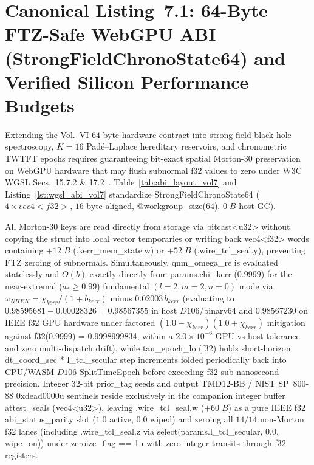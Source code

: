 \documentclass[11pt,a4paper,reqno]{article}
\def\texttt#1{#1}%
\def\mathrm#1{#1}%
\def\mathcal#1{#1}%
\def\mathbb#1{#1}%
\def\Done{D106}%
\theoremstyle{plain}
\theoremstyle{definition}
\theoremstyle{remark}
\numberwithin{equation}{section}
\numberwithin{table}{section}
\newcommand{\Done}{\mathbb{D}_{106}}
\begin{document}
{\raggedright
\section{\texorpdfstring{Canonical Listing~7.1: 64-Byte FTZ-Safe WebGPU ABI (\texttt{StrongFieldChronoState64}) and Verified Silicon Performance Budgets}{Canonical Listing 7.1: 64-Byte FTZ-Safe WebGPU ABI (StrongFieldChronoState64) and Verified Silicon Performance Budgets}}
}
\label{sec:wgsl_abi_vol7}

Extending the Vol.~VI $64$-byte hardware contract \cite{AppliedPuristVol6Solinas2026} into strong-field black-hole spectroscopy, $K=16$ Pad\'e--Laplace hereditary reservoirs, and chronometric TWTFT epochs requires guaranteeing bit-exact spatial Morton-30 preservation on WebGPU hardware that may flush subnormal \texttt{f32} values to zero under W3C WGSL Secs.~15.7.2 \& 17.2~\cite{W3CWGSL2026}. Table~\ref{tab:abi_layout_vol7} and Listing~\ref{lst:wgsl_abi_vol7} standardize \texttt{StrongFieldChronoState64} ($4 \times \texttt{vec4<f32>}$, $16$-byte aligned, \texttt{@workgroup\_size(64)}, $0\;\mathrm{B}$ host GC).

All Morton-30 keys are read directly from storage via \texttt{bitcast<u32>} without copying the struct into local vector temporaries or writing back \texttt{vec4<f32>} words containing $+12\;\mathrm{B}$ (\texttt{.kerr\_mem\_state.w}) or $+52\;\mathrm{B}$ (\texttt{.wire\_tcl\_seal.y}), preventing FTZ zeroing of subnormals. Simultaneously, \texttt{qnm\_omega\_re} is evaluated statelessly and $\mathcal{O}(b)$-exactly directly from \texttt{params.chi\_kerr} ($0.9999$) for the near-extremal ($a_* \ge 0.99$) fundamental $(l=2, m=2, n=0)$ mode via $\omega_{\mathrm{NHEK}} = \chi_{\mathrm{kerr}}/(1+b_{\mathrm{kerr}})$ minus $0.02003\,b_{\mathrm{kerr}}$ (evaluating to $0.98595681 - 0.00028326 = 0.98567355$ in host $\Done$/\texttt{binary64} and $0.98567230$ on IEEE \texttt{f32} GPU hardware under factored $(1.0-\chi_{\mathrm{kerr}})(1.0+\chi_{\mathrm{kerr}})$ mitigation against \texttt{f32(0.9999) = 0.9998999834}, within a $2.0\times 10^{-6}$ GPU-vs-host tolerance and zero multi-dispatch drift), while \texttt{tau\_epoch\_lo} (\texttt{f32}) holds short-horizon \texttt{dt\_coord\_sec * l\_tcl\_secular} step increments folded periodically back into CPU/WASM $\Done$ \texttt{SplitTimeEpoch} before exceeding \texttt{f32} sub-nanosecond precision. Integer $32$-bit \texttt{prior\_tag} seeds and output \texttt{TMD12-BB} / NIST SP~800-88 \texttt{0xdead0000u} sentinels \cite{NISTSP80088,TMDHashV122026} reside exclusively in the companion integer buffer \texttt{attest\_seals} (\texttt{vec4<u32>}), leaving \texttt{.wire\_tcl\_seal.w} ($+60\;\mathrm{B}$) as a pure IEEE \texttt{f32} \texttt{abi\_status\_parity} slot ($1.0$ active, $0.0$ wiped) and zeroing all $14/14$ non-Morton \texttt{f32} lanes (including \texttt{.wire\_tcl\_seal.z} via \texttt{select(params.l\_tcl\_secular, 0.0, wipe\_on)}) under \texttt{zeroize\_flag == 1u} with zero integer transits through \texttt{f32} registers.
\end{document}
